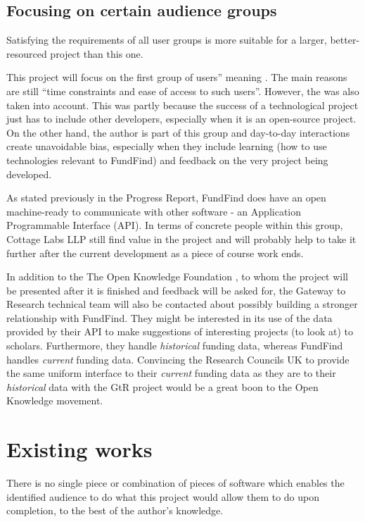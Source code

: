 \subsection{Focusing on certain audience groups}
\label{focus-groups}
Satisfying the requirements of all user groups is more suitable for a larger, better-resourced project than this one.

This project will focus on the first group of users'' meaning . The main reasons are still ``time constraints and ease of access to such users''. However, the  was also taken into account. This was partly because the success of a technological project just has to include other developers, especially when it is an open-source project. On the other hand, the author is part of this group and day-to-day interactions create unavoidable bias, especially when they include learning (how to use technologies relevant to FundFind) and feedback on the very project being developed.

As stated previously in the Progress Report, FundFind does have an open machine-ready to communicate with other software - an Application Programmable Interface (API). In terms of concrete people within this group, Cottage Labs LLP \cite{cl} still find value in the project and will probably help to take it further after the current development as a piece of course work ends.

In addition to the The Open Knowledge Foundation \cite{okfn-vision}, to whom the project will be presented after it is finished and feedback will be asked for, the Gateway to Research technical team will also be contacted about possibly building a stronger relationship with FundFind. They might be interested in its use of the data provided by their API to make suggestions of interesting projects (to look at) to scholars. Furthermore, they handle \emph{historical} funding data, whereas FundFind handles \emph{current} funding data. Convincing the Research Councils UK to provide the same uniform interface to their \emph{current} funding data as they are to their \emph{historical} data with the GtR project would be a great boon to the Open Knowledge movement.

\section{Existing works}
\label{existing-works}
There is no single piece or combination of pieces of software which enables the identified audience to do what this project would allow them to do upon completion, to the best of the author's knowledge.

